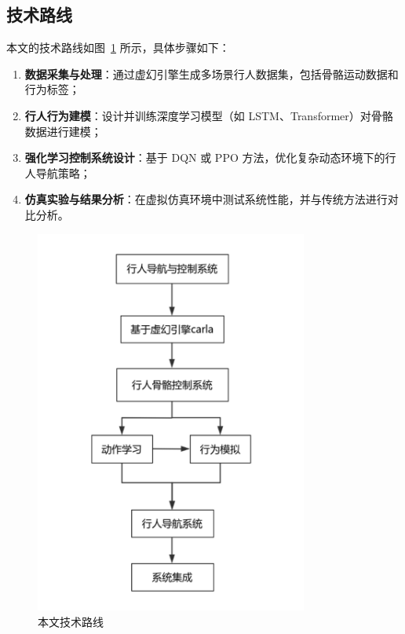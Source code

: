 \subsection{技术路线}

本文的技术路线如图~\ref{fig:tech_route} 所示，具体步骤如下：
\begin{enumerate}
    \item \textbf{数据采集与处理}：通过虚幻引擎生成多场景行人数据集，包括骨骼运动数据和行为标签；
    \item \textbf{行人行为建模}：设计并训练深度学习模型（如 LSTM、Transformer）对骨骼数据进行建模；
    \item \textbf{强化学习控制系统设计}：基于 DQN 或 PPO 方法，优化复杂动态环境下的行人导航策略；
    \item \textbf{仿真实验与结果分析}：在虚拟仿真环境中测试系统性能，并与传统方法进行对比分析。
\end{enumerate}

\begin{figure}[htbp]
    \centering
    \includegraphics[width=0.8\textwidth]{tech_route.pdf}
    \caption{本文技术路线}
    \label{fig:tech_route}
\end{figure}
